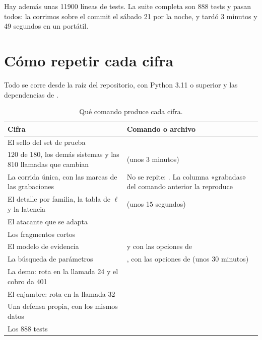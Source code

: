 Hay además unas \num{11900} líneas de tests. La suite completa son 888 tests y pasan todos: la corrimos
sobre el commit  el sábado 21 por la noche, y tardó 3 minutos y 49 segundos en un
portátil.

\section{Cómo repetir cada cifra}\label{ap:repetir}

Todo se corre desde la raíz del repositorio, con Python 3.11 o superior y las dependencias de
.

\begin{table}[ht]
\caption{Qué comando produce cada cifra.}\label{tab:repetir}
\small
\begin{tabularx}{\textwidth}{@{}LL@{}}
\toprule
Cifra & Comando o archivo \\
\midrule
El sello del set de prueba &  \\
120 de 180, los demás sistemas y las 810 llamadas que cambian & 
  (unos 3 minutos) \\
La corrida única, con las marcas de las grabaciones & No se repite: . La columna
  «grabadas» del comando anterior la reproduce \\
El detalle por familia, la tabla de $\ell$ y la latencia & 
  (unos 15 segundos) \\
El atacante que se adapta &  \\
Los fragmentos cortos &  \\
El modelo de evidencia &  y 
  con las opciones de  \\
La búsqueda de parámetros & , con las opciones de 
  (unos 30 minutos) \\
La demo: rota en la llamada 24 y el cobro da 401 &  \\
El enjambre: rota en la llamada 32 &  \\
Una defensa propia, con los mismos datos &  \\
Los 888 tests &  \\
\bottomrule
\end{tabularx}
\end{table}

